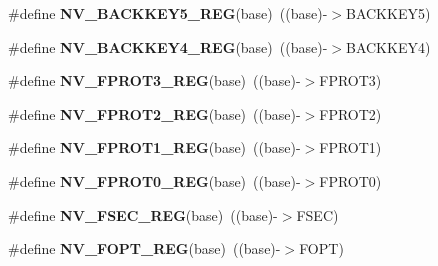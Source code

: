 \begin{DoxyCompactItemize}
\item 
\#define {\bfseries N\+V\+\_\+\+B\+A\+C\+K\+K\+E\+Y5\+\_\+\+R\+EG}(base)~((base)-\/$>$B\+A\+C\+K\+K\+E\+Y5)\hypertarget{group__NV__Register__Accessor__Macros_ga8c8a046af59b1a140ff75cc826b355aa}{}\label{group__NV__Register__Accessor__Macros_ga8c8a046af59b1a140ff75cc826b355aa}

\item 
\#define {\bfseries N\+V\+\_\+\+B\+A\+C\+K\+K\+E\+Y4\+\_\+\+R\+EG}(base)~((base)-\/$>$B\+A\+C\+K\+K\+E\+Y4)\hypertarget{group__NV__Register__Accessor__Macros_gaf87830b9bc5bb55e664df8929d49eac1}{}\label{group__NV__Register__Accessor__Macros_gaf87830b9bc5bb55e664df8929d49eac1}

\item 
\#define {\bfseries N\+V\+\_\+\+F\+P\+R\+O\+T3\+\_\+\+R\+EG}(base)~((base)-\/$>$F\+P\+R\+O\+T3)\hypertarget{group__NV__Register__Accessor__Macros_ga7ef7bb75074b8db9da605af5ca216f74}{}\label{group__NV__Register__Accessor__Macros_ga7ef7bb75074b8db9da605af5ca216f74}

\item 
\#define {\bfseries N\+V\+\_\+\+F\+P\+R\+O\+T2\+\_\+\+R\+EG}(base)~((base)-\/$>$F\+P\+R\+O\+T2)\hypertarget{group__NV__Register__Accessor__Macros_gabac2653345915e29796a13ba870336c3}{}\label{group__NV__Register__Accessor__Macros_gabac2653345915e29796a13ba870336c3}

\item 
\#define {\bfseries N\+V\+\_\+\+F\+P\+R\+O\+T1\+\_\+\+R\+EG}(base)~((base)-\/$>$F\+P\+R\+O\+T1)\hypertarget{group__NV__Register__Accessor__Macros_ga2cb779bd7985368b49343a7a4227a4c2}{}\label{group__NV__Register__Accessor__Macros_ga2cb779bd7985368b49343a7a4227a4c2}

\item 
\#define {\bfseries N\+V\+\_\+\+F\+P\+R\+O\+T0\+\_\+\+R\+EG}(base)~((base)-\/$>$F\+P\+R\+O\+T0)\hypertarget{group__NV__Register__Accessor__Macros_ga7142989d8224cb5f1b5e466c72363e3a}{}\label{group__NV__Register__Accessor__Macros_ga7142989d8224cb5f1b5e466c72363e3a}

\item 
\#define {\bfseries N\+V\+\_\+\+F\+S\+E\+C\+\_\+\+R\+EG}(base)~((base)-\/$>$F\+S\+EC)\hypertarget{group__NV__Register__Accessor__Macros_ga67787d311ca4c58b135b4427b0431dca}{}\label{group__NV__Register__Accessor__Macros_ga67787d311ca4c58b135b4427b0431dca}

\item 
\#define {\bfseries N\+V\+\_\+\+F\+O\+P\+T\+\_\+\+R\+EG}(base)~((base)-\/$>$F\+O\+PT)\hypertarget{group__NV__Register__Accessor__Macros_ga0fd99fc3ae6d1b27bb5e0448f6c90761}{}\label{group__NV__Register__Accessor__Macros_ga0fd99fc3ae6d1b27bb5e0448f6c90761}


\end{DoxyCompactItemize}
